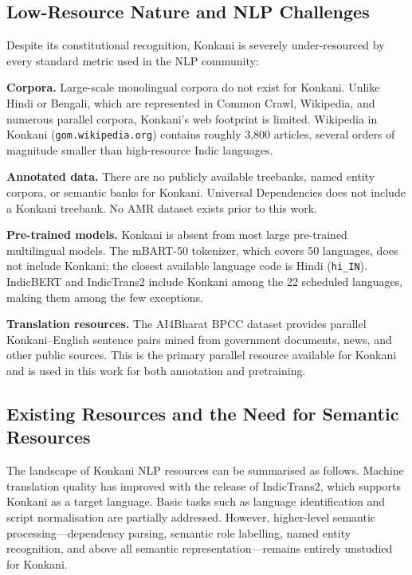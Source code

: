 \subsection{Low-Resource Nature and NLP Challenges}

Despite its constitutional recognition, Konkani is severely under-resourced by every standard metric used in the NLP community:

\textbf{Corpora.} Large-scale monolingual corpora do not exist for Konkani. Unlike Hindi or Bengali, which are represented in Common Crawl, Wikipedia, and numerous parallel corpora, Konkani's web footprint is limited. Wikipedia in Konkani (\texttt{gom.wikipedia.org}) contains roughly 3,800 articles, several orders of magnitude smaller than high-resource Indic languages.

\textbf{Annotated data.} There are no publicly available treebanks, named entity corpora, or semantic banks for Konkani. Universal Dependencies does not include a Konkani treebank. No AMR dataset exists prior to this work.

\textbf{Pre-trained models.} Konkani is absent from most large pre-trained multilingual models. The mBART-50 tokenizer, which covers 50 languages, does not include Konkani; the closest available language code is Hindi (\texttt{hi\_IN}). IndicBERT \cite{kakwani2020indicnlpsuite} and IndicTrans2 \cite{gala2023indictrans2} include Konkani among the 22 scheduled languages, making them among the few exceptions.

\textbf{Translation resources.} The AI4Bharat BPCC dataset \cite{gala2023indictrans2} provides parallel Konkani–English sentence pairs mined from government documents, news, and other public sources. This is the primary parallel resource available for Konkani and is used in this work for both annotation and pretraining.

\subsection{Existing Resources and the Need for Semantic Resources}

The landscape of Konkani NLP resources can be summarised as follows. Machine translation quality has improved with the release of IndicTrans2, which supports Konkani as a target language. Basic tasks such as language identification and script normalisation are partially addressed. However, higher-level semantic processing—dependency parsing, semantic role labelling, named entity recognition, and above all semantic representation—remains entirely unstudied for Konkani.

